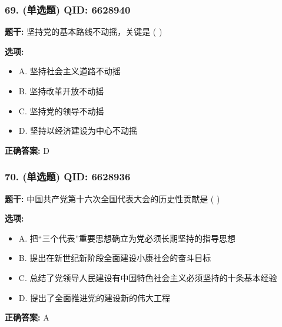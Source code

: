 \documentclass[12pt,UTF8]{ctexart}
\begin{document}
\subsubsection*{69. (单选题) \small QID: 6628940}

\textbf{题干:}
坚持党的基本路线不动摇，关键是  ( )

\textbf{选项:}
\begin{itemize}[leftmargin=*]

  \item A. 坚持社会主义道路不动摇

  \item B. 坚持改革开放不动摇

  \item C. 坚持党的领导不动摇

  \item D. 坚持以经济建设为中心不动摇

\end{itemize}

\textbf{正确答案:}
D

\vspace{0.3em}\hrulefill\vspace{0.7em}

\subsubsection*{70. (单选题) \small QID: 6628936}

\textbf{题干:}
中国共产党第十六次全国代表大会的历史性贡献是  ( )

\textbf{选项:}
\begin{itemize}[leftmargin=*]

  \item A. 把“三个代表”重要思想确立为党必须长期坚持的指导思想

  \item B. 提出在新世纪新阶段全面建设小康社会的奋斗目标

  \item C. 总结了党领导人民建设有中国特色社会主义必须坚持的十条基本经验

  \item D. 提出了全面推进党的建设新的伟大工程

\end{itemize}

\textbf{正确答案:}
A

\vspace{0.3em}\hrulefill\vspace{0.7em}
\end{document}
